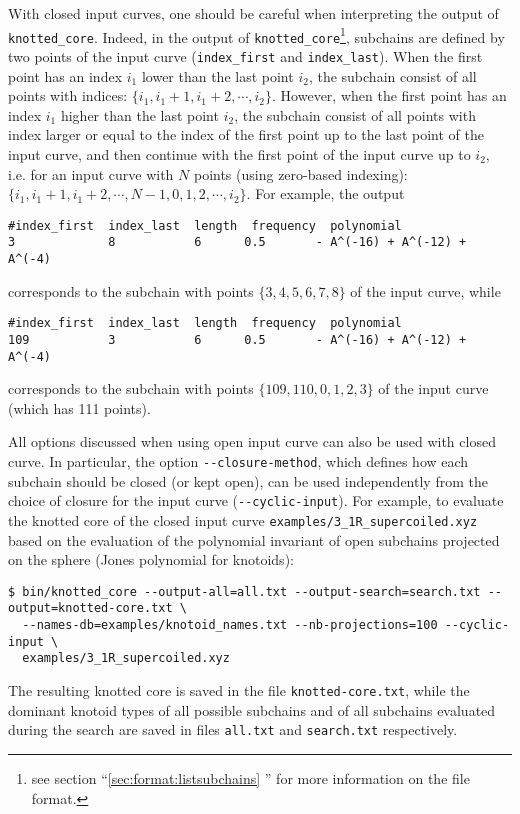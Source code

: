 With closed input curves, one should be careful when interpreting the output of \lstinline{knotted_core}. Indeed, in the output of \lstinline{knotted_core}\footnote{see section ``\ref{sec:format:listsubchains} '' for more information on the file format.}, subchains are defined by two points of the input curve (\lstinline{index_first} and \lstinline{index_last}). When the first point has an index $i_1$ lower than the last point $i_2$, the subchain consist of all points with indices: $\{i_1,i_1+1,i_1+2,\cdots,i_2\}$.
However, when the first point has an index $i_1$ higher than the last point $i_2$, the subchain consist of all points with index larger or equal to the index of the first point up to the last point of the input curve, and then continue with the first point of the input curve up to $i_2$, i.e. for an input curve with $N$ points (using zero-based indexing): $\{i_1,i_1+1,i_1+2,\cdots,N-1,0,1,2,\cdots,i_2\}$. For example, the output
\begin{lstlisting}
#index_first  index_last  length  frequency  polynomial
3             8           6      0.5       - A^(-16) + A^(-12) + A^(-4)
\end{lstlisting}
corresponds to the subchain with points $\{3,4,5,6,7,8\}$ of the input curve, while 
\begin{lstlisting}
#index_first  index_last  length  frequency  polynomial
109           3           6      0.5       - A^(-16) + A^(-12) + A^(-4)
\end{lstlisting}
corresponds to the subchain with points $\{109,110,0,1,2,3\}$ of the input curve (which has 111 points).

All options discussed when using open input curve can also be used with closed curve. In particular, the option \lstinline{--closure-method}, which defines how each subchain should be closed (or kept open), can be used independently from the choice of closure for the input curve (\lstinline{--cyclic-input}). For example, to evaluate the knotted core of the closed input curve \lstinline{examples/3_1R_supercoiled.xyz} based on the evaluation of the polynomial invariant of open subchains projected on the sphere (Jones polynomial for knotoids):
\begin{lstlisting}
$ bin/knotted_core --output-all=all.txt --output-search=search.txt --output=knotted-core.txt \
  --names-db=examples/knotoid_names.txt --nb-projections=100 --cyclic-input \
  examples/3_1R_supercoiled.xyz
\end{lstlisting}
The resulting knotted core is saved in the file \lstinline{knotted-core.txt}, while the dominant knotoid types of all possible subchains and of all subchains evaluated during the search are saved in files \lstinline{all.txt} and \lstinline{search.txt} respectively.


